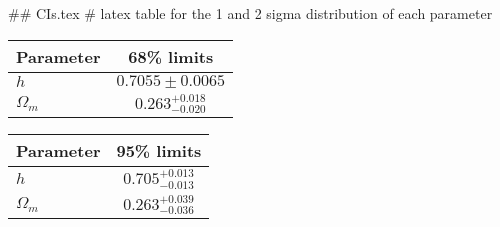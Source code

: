 ## CIs.tex
# latex table for the 1 and 2 sigma distribution of each parameter

\begin{tabular} { l  c}
 Parameter &  68\% limits\\
\hline
{\boldmath$h              $} & $0.7055\pm 0.0065          $\\
{\boldmath$\Omega_m       $} & $0.263^{+0.018}_{-0.020}   $\\
\hline
\end{tabular}

\begin{tabular} { l  c}
 Parameter &  95\% limits\\
\hline
{\boldmath$h              $} & $0.705^{+0.013}_{-0.013}   $\\
{\boldmath$\Omega_m       $} & $0.263^{+0.039}_{-0.036}   $\\
\hline
\end{tabular}

